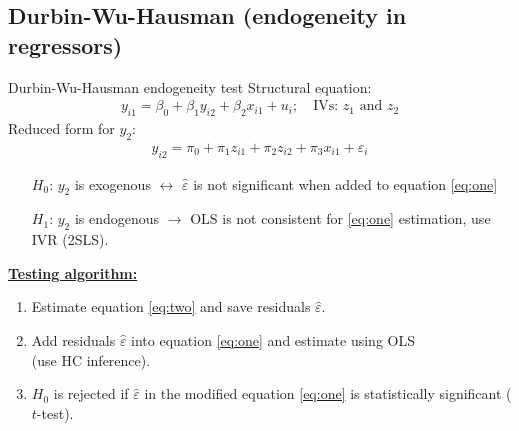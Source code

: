 \documentclass[usenames,dvipsnames]{beamer}
\begin{document}
\subsection{Durbin-Wu-Hausman (endogeneity in regressors)}
\begin{frame}{Durbin-Wu-Hausman endogeneity test}
Structural equation: 
\begin{align}
\label{eq:one} y_{i1}=\beta_0+\beta_1 y_{i2} + \beta_2 x_{i1} + u_i; \quad \text{IVs: $z_1$ and $z_2$}
\end{align}
Reduced form for $y_2$: 
\begin{align}
\label{eq:two} y_{i2}=\pi_0 + \pi_1 z_{i1} + \pi_2 z_{i2} + \pi_3 x_{i1} + \varepsilon_i
\end{align}
\vspace{-0.4cm}
\begin{itemize}
\item[$H_0$:] $y_2$ is exogenous $\leftrightarrow$ $\hat{\varepsilon}$ is not significant when added to equation \eqref{eq:one}
\item[$H_1$:] $y_2$ is endogenous $\rightarrow$ OLS is not consistent for \eqref{eq:one} estimation, use IVR (2SLS).
\end{itemize}
\textbf{\underline{Testing algorithm:}}
\begin{enumerate}
\item Estimate equation \eqref{eq:two} and save residuals $\hat{\varepsilon}$.
\item Add residuals $\hat{\varepsilon}$ into equation \eqref{eq:one} and estimate using OLS\\ (use HC inference).
\item $H_0$ is rejected if $\hat{\varepsilon}$ in the modified equation \eqref{eq:one} is statistically significant ($t$-test).
\end{enumerate}
\end{frame}
\end{document}
